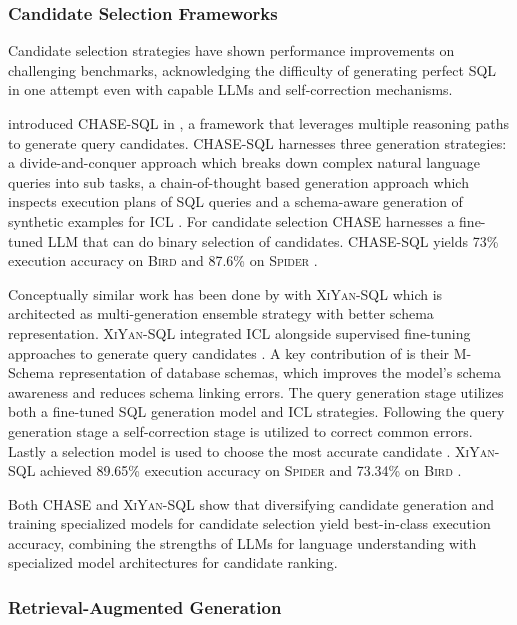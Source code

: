 \subsubsection{Candidate Selection Frameworks}

Candidate selection strategies have shown performance improvements on
challenging benchmarks, acknowledging the difficulty of generating perfect SQL
in one attempt even with capable LLMs and self-correction mechanisms.

\cite{CHASE} introduced CHASE-SQL in \citeyear{CHASE}, a framework that
leverages multiple reasoning paths to generate query candidates. CHASE-SQL
harnesses three generation strategies: a divide-and-conquer approach which
breaks down complex natural language queries into sub tasks, a
chain-of-thought based generation approach which inspects execution plans of
SQL queries and a schema-aware generation of synthetic examples for ICL
\citep{CHASE}. For candidate selection CHASE harnesses a fine-tuned LLM that
can do binary selection of candidates. CHASE-SQL yields 73\% execution accuracy
on \textsc{Bird} and 87.6\% on \textsc{Spider} \citep{CHASE}.

Conceptually similar work has been done by \citeauthor*{XiYan} with
\textsc{XiYan-SQL} which is architected as multi-generation ensemble strategy
with better schema representation. \textsc{XiYan-SQL} integrated ICL alongside
supervised fine-tuning approaches to generate query candidates \citep{XiYan}.
A key contribution of \cite{XiYan} is their M-Schema representation of database
schemas, which improves the model's schema awareness and reduces schema linking
errors. The query generation stage utilizes both a fine-tuned SQL generation
model and ICL strategies. Following the query generation stage a
self-correction stage is utilized to correct common errors. Lastly a selection
model is used to choose the most accurate candidate \citep{XiYan}.
\textsc{XiYan-SQL} achieved 89.65\% execution accuracy on \textsc{Spider} and
73.34\% on \textsc{Bird} \citep{XiYan}.

Both CHASE and \textsc{XiYan-SQL} show that diversifying candidate generation
and training specialized models for candidate selection yield best-in-class
execution accuracy, combining the strengths of LLMs for language understanding
with specialized model architectures for candidate ranking.

\subsubsection{Retrieval-Augmented Generation}

